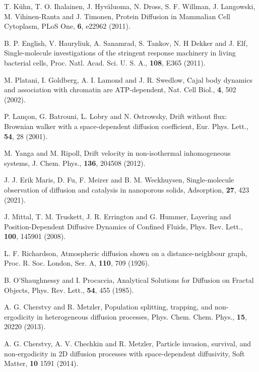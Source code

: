 \documentclass[showpacs,amsmath,amssymb,aps,pre,twocolumn,]{revtex4-1}
\begin{document}
%
\begin{thebibliography}{}

T. K\"{u}hn, T. O. Ihalainen, J. Hyv\"{a}luoma, N. Dross, S. F. Willman, J. Langowski, M. Vihinen-Ranta and J. Timonen, Protein Diffusion in Mammalian Cell Cytoplasm, PLoS One, \textbf{6}, e22962 (2011). 

B. P. English, V. Hauryliuk, A. Sanamrad, S. Tankov, N. H Dekker and J. Elf, Single-molecule investigations of the stringent response machinery in living bacterial cells, Proc. Natl. Acad. Sci. U. S. A., \textbf{108}, E365 (2011).

M. Platani, I. Goldberg, A. I. Lamond and J. R. Swedlow, Cajal body dynamics and association with chromatin are ATP-dependent, Nat. Cell Biol., \textbf{4}, 502 (2002).

P. Lan\c con, G. Batrouni, L. Lobry and N. Ostrowsky, Drift without flux: Brownian walker with a space-dependent diffusion coefficient, Eur. Phys. Lett., \textbf{54}, 28 (2001).  

M. Yanga and M. Ripoll, Drift velocity in non-isothermal inhomogeneous systems, J. Chem. Phys., \textbf{136}, 204508 (2012).

J. J. Erik Maris, D. Fu, F. Meirer and B. M. Weckhuysen, Single-molecule observation of diffusion and catalysis in nanoporous solids, Adsorption, \textbf{27}, 423 (2021).

J. Mittal, T. M. Truskett, J. R. Errington and G. Hummer, Layering and Position-Dependent Diffusive Dynamics of Confined Fluids, Phys. Rev. Lett., \textbf{100}, 145901 (2008).

L. F. Richardson, Atmospheric diffusion shown on a distance-neighbour graph, Proc. R. Soc. London, Ser. A, \textbf{110}, 709 (1926).

B. O’Shaughnessy and I. Procaccia, Analytical Solutions for Diffusion on Fractal Objects, Phys. Rev. Lett., \textbf{54}, 455 (1985).

A. G. Cherstvy and R. Metzler, Population splitting, trapping, and non-ergodicity in heterogeneous diffusion processes, Phys. Chem. Chem. Phys., \textbf{15}, 20220 (2013).

A. G. Cherstvy, A. V. Chechkin and R. Metzler, Particle invasion, survival, and non-ergodicity in 2D diffusion processes with
space-dependent diffusivity, Soft Matter, \textbf{10} 1591 (2014).


\end{thebibliography}
\end{document}
